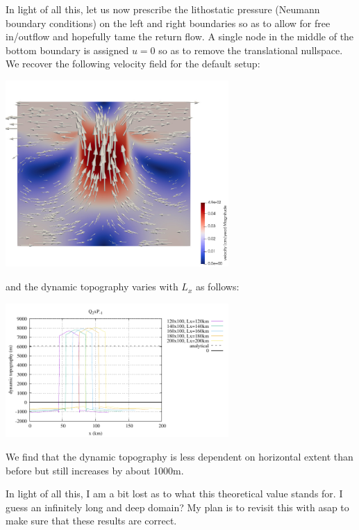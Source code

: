 In light of all this, let us now prescribe the lithostatic pressure (Neumann boundary conditions)
on the left and right boundaries so as to allow for free in/outflow and hopefully tame the 
return flow. A single node in the middle of the bottom boundary is assigned $u=0$ so as 
to remove the translational nullspace. We recover the following velocity field 
for the default setup:
\begin{center}
\includegraphics[width=8.5cm]{python_codes/fieldstone_160/results/neumann/velN}
\end{center}
and the dynamic topography varies with $L_x$ as follows:
\begin{center}
\includegraphics[width=8.5cm]{python_codes/fieldstone_160/results/dyn_topo6.pdf}
\end{center}
We find that the dynamic topography is less dependent on horizontal extent than before
but still increases by about 1000m.

 
In light of all this, I am a bit lost as to what this theoretical value 
stands for. I guess an infinitely long and deep domain? 
My plan is to revisit this with \aspect asap to make sure that these results are correct.





